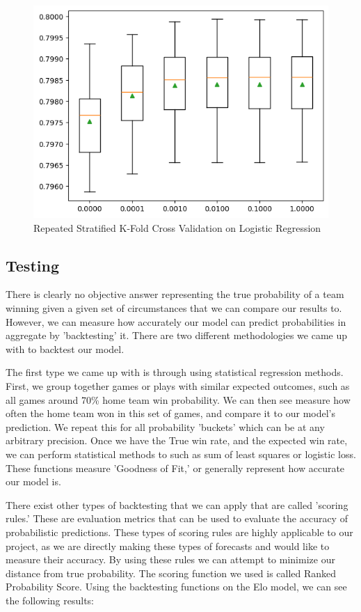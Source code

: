 \documentclass{article}
\begin{document}
\begin{figure}
    \centering
    \includegraphics[width=0.75\linewidth]{kfold.png}
    \caption{Repeated Stratified K-Fold Cross Validation on Logistic Regression}
    \label{fig:kfold}
\end{figure}

\subsection{Testing}
There is clearly no objective answer representing the true probability of a team winning given a given set of circumstances that we can compare our results to.
However, we can measure how accurately our model can predict probabilities in aggregate by 'backtesting' it.
There are two different methodologies we came up with to backtest our model. 

The first type we came up with is through using statistical regression methods. 
First, we group together games or plays with similar expected outcomes, such as all games around 70\% home team win probability. We can then see measure how often
the home team won in this set of games, and compare it to our model's prediction. We repeat this for all probability 'buckets' which can be at any arbitrary precision.
Once we have the True win rate, and the expected win rate, we can perform statistical methods to such as sum of least squares or logistic loss. These functions measure 'Goodness of Fit,' 
or generally represent how accurate our model is. 

There exist other types of backtesting that we can apply that are called 'scoring rules.' These are evaluation metrics that can be used to evaluate the accuracy of probabilistic predictions.
These types of scoring rules are highly applicable to our project, as we are directly making these types of forecasts and would like to measure their accuracy. By using these rules we can attempt to minimize our distance from true probability.
The scoring function we used is called Ranked Probability Score. Using the backtesting functions on the Elo model, we can see the following results:
\end{document}
